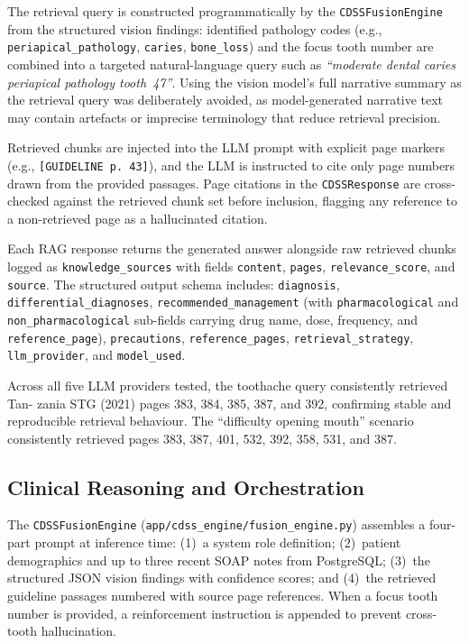 \documentclass[12pt,a4paper]{report}
\begin{document}
The retrieval query is constructed programmatically by the
\texttt{CDSSFusionEngine} from the structured vision findings:
identified pathology codes (e.g., \texttt{periapical\_pathology},
\texttt{caries}, \texttt{bone\_loss}) and the focus tooth number are
combined into a targeted natural-language query such as \textit{``moderate
dental caries periapical pathology tooth~47''}.  Using the vision
model's full narrative summary as the retrieval query was deliberately
avoided, as model-generated narrative text may contain artefacts or
imprecise terminology that reduce retrieval precision.

Retrieved chunks are injected into the LLM prompt with explicit page
markers (e.g., \verb|[GUIDELINE p. 43]|), and the LLM is instructed to
cite only page numbers drawn from the provided passages.  Page citations
in the \texttt{CDSSResponse} are cross-checked against the retrieved
chunk set before inclusion, flagging any reference to a non-retrieved
page as a hallucinated citation.

Each RAG response returns the generated answer alongside raw retrieved
chunks logged as \texttt{knowledge\_sources} with fields
\texttt{content}, \texttt{pages}, \texttt{relevance\_score}, and
\texttt{source}.  The structured output schema includes:
\texttt{diagnosis}, \texttt{differential\_diagnoses},
\texttt{recommended\_management} (with \texttt{pharmacological} and
\texttt{non\_pharmacological} sub-fields carrying drug name, dose,
frequency, and \texttt{reference\_page}), \texttt{precautions},
\texttt{reference\_pages}, \texttt{retrieval\_strategy},
\texttt{llm\_provider}, and \texttt{model\_used}.

Across all five LLM providers tested, the toothache query consistently retrieved Tan-
zania STG (2021) pages 383, 384, 385, 387, and 392, confirming stable and reproducible retrieval
behaviour. The “difficulty opening mouth” scenario consistently retrieved pages 383, 387,
401, 532, 392, 358, 531, and 387.

\subsection{Clinical Reasoning and Orchestration}
\label{subsec:cdss_impl}

The \texttt{CDSSFusionEngine} (\texttt{app/cdss\_engine/fusion\_engine.py})
assembles a four-part prompt at inference time: (1)~a system role
definition; (2)~patient demographics and up to three recent SOAP notes
from PostgreSQL; (3)~the structured JSON vision findings with confidence
scores; and (4)~the retrieved guideline passages numbered with source
page references.  When a focus tooth number is provided, a reinforcement
instruction is appended to prevent cross-tooth hallucination.
\end{document}
